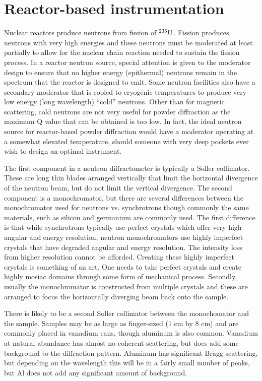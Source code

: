 \section{Reactor-based instrumentation}
Nuclear reactors produce neutrons from fission of ${}^{235}\rm{U}$. Fission produces neutrons with very high energies and these neutrons must be moderated at least partially to allow for the nuclear chain reaction needed to sustain the fission process. In a reactor neutron source, special attention is given to the moderator design to ensure that no higher energy (epithermal) neutrons remain in the spectrum that the reactor is designed to emit. Some neutron facilities also have a secondary moderator that is cooled to cryogenic temperatures to produce very low energy (long wavelength) ``cold'' neutrons. Other than for magnetic scattering, cold neutrons are not very useful for powder diffraction as the maximum Q value that can be obtained is too low. In fact, the ideal neutron source for reactor-based powder diffraction would have a moderator operating at a somewhat elevated temperature, should someone with very deep pockets ever wish to design an optimal instrument.

The first component in a neutron diffractometer is typically a Soller collimator. These are long thin blades arranged vertically that limit the horizontal divergence of the neutron beam, but do not limit the vertical divergence. The second component is a monochromator, but there are several differences between the monochromator used for neutrons vs. synchrotrons though commonly the same materials, such as silicon and germanium are commonly used. The first difference is that while synchrotrons typically use perfect crystals which offer very high angular and energy resolution, neutron monochromators use highly imperfect crystals that have degraded angular and energy resolution. The intensity loss from higher resolution cannot be afforded. Creating these highly imperfect crystals is something of an art. One needs to take perfect crystals and create highly mosiac domains through some form of mechanical process. Secondly, usually the monochromator is constructed from multiple crystals and these are arranged to focus the horizontally diverging beam back onto the sample. 

There is likely to be a second Soller collimator between the monochomator and the sample. Samples may be as large as finger-sized (1 cm by 8 cm) and are commonly placed in vanadium cans, though aluminum is also common. Vanadium at natural abundance has almost no coherent scattering, but does add some background to the diffraction pattern. Aluminum has significant Bragg scattering, but depending on the wavelength this will be in a fairly small number of peaks, but Al does not add any significant amount of background. 

